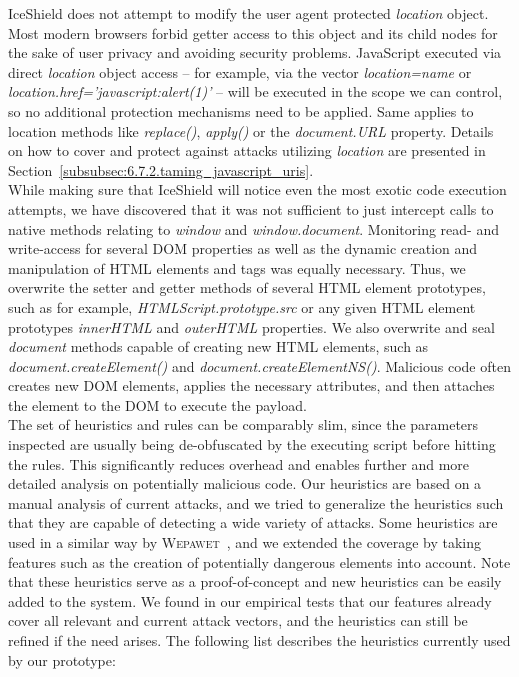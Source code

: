     IceShield does not attempt to modify the user agent protected \textit{location} object. Most modern browsers forbid getter access to this object and its child nodes for the sake of user privacy and avoiding security problems. JavaScript executed via direct \textit{location} object access -- for example, via the vector \textit{location=name} or \textit{location.href='javascript:alert(1)'} -- will be executed in the scope we can control, so no additional protection mechanisms need to be applied. Same applies to location methods like \textit{replace()}, \textit{apply()} or the \textit{document.URL} property. Details on how to cover and protect against attacks utilizing \textit{location} are presented in Section~\ref{subsubsec:6.7.2.taming_javascript_uris}.\\

    While making sure that IceShield will notice even the most exotic code execution attempts, we have discovered that it was not sufficient to just intercept calls to native methods relating to \textit{window} and \textit{window.document}. Monitoring read- and write-access for several DOM properties as well as the dynamic creation and manipulation of HTML elements and tags was equally necessary. Thus, we overwrite the setter and getter methods of several HTML element prototypes, such as for example, \textit{HTMLScript.prototype.src} or any given HTML element prototypes \textit{innerHTML} and \textit{outerHTML} properties. We also overwrite and seal \textit{document} methods capable of creating new HTML elements, such as \textit{document.createElement()} and \textit{document.createElementNS()}. Malicious code often creates new DOM elements, applies the necessary attributes, and then attaches the element to the DOM to execute the payload. \\

The set of heuristics and rules can be comparably slim, since the parameters inspected are usually being de-obfuscated by the executing script before hitting the rules. This significantly reduces overhead and enables further and more detailed analysis on potentially malicious code. Our heuristics are based on a manual analysis of current attacks, and we tried to generalize the heuristics such that they are capable of detecting a wide variety of attacks. Some heuristics are used in a similar way by \textsc{Wepawet}~\cite{cova_detection_2010}, and we extended the coverage by taking features such as the creation of potentially dangerous elements into account. Note that these heuristics serve as a proof-of-concept and new heuristics can be easily added to the system. We found in our empirical tests that our features already cover all relevant and current attack vectors, and the heuristics can still be refined if the need arises. The following list describes the heuristics currently used by our prototype: 

